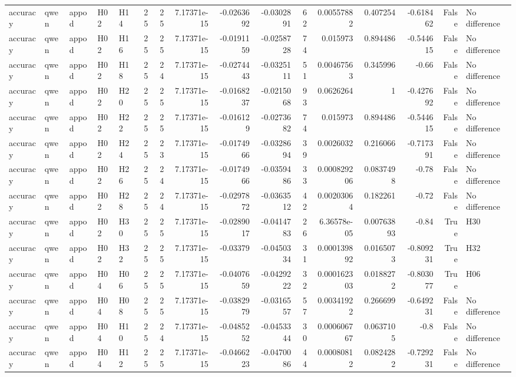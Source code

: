 \begin{longtable}{lllllrrrrrrrrrrl}
accuracy & qwen & appod & H02 & H14 & 25 & 25 & 7.17371e-15 & -0.0263692 & -0.0302891 & 62 & 0.00557882 & 0.407254 & -0.618462 & False & No difference \\
accuracy & qwen & appod & H02 & H16 & 25 & 25 & 7.17371e-15 & -0.0191159 & -0.0258728 & 74 & 0.015973 & 0.894486 & -0.544615 & False & No difference \\
accuracy & qwen & appod & H02 & H18 & 25 & 24 & 7.17371e-15 & -0.0274443 & -0.0325111 & 51 & 0.00467563 & 0.345996 & -0.66 & False & No difference \\
accuracy & qwen & appod & H02 & H20 & 25 & 25 & 7.17371e-15 & -0.0168237 & -0.0215068 & 93 & 0.0626264 & 1 & -0.427692 & False & No difference \\
accuracy & qwen & appod & H02 & H22 & 25 & 25 & 7.17371e-15 & -0.016129 & -0.0273682 & 74 & 0.015973 & 0.894486 & -0.544615 & False & No difference \\
accuracy & qwen & appod & H02 & H24 & 25 & 23 & 7.17371e-15 & -0.0174966 & -0.0328694 & 39 & 0.0026032 & 0.216066 & -0.717391 & False & No difference \\
accuracy & qwen & appod & H02 & H26 & 25 & 24 & 7.17371e-15 & -0.0174966 & -0.0359486 & 33 & 0.000829206 & 0.0837498 & -0.78 & False & No difference \\
accuracy & qwen & appod & H02 & H28 & 25 & 24 & 7.17371e-15 & -0.0297872 & -0.0363512 & 42 & 0.00203064 & 0.182261 & -0.72 & False & No difference \\
accuracy & qwen & appod & H02 & H30 & 25 & 25 & 7.17371e-15 & -0.0289017 & -0.0414783 & 26 & 6.36578e-05 & 0.00763893 & -0.84 & True & H30 \\
accuracy & qwen & appod & H02 & H32 & 25 & 25 & 7.17371e-15 & -0.03379 & -0.0450334 & 31 & 0.000139892 & 0.0165073 & -0.809231 & True & H32 \\
accuracy & qwen & appod & H04 & H06 & 25 & 25 & 7.17371e-15 & -0.0407659 & -0.0429222 & 32 & 0.000162303 & 0.0188272 & -0.803077 & True & H06 \\
accuracy & qwen & appod & H04 & H08 & 25 & 25 & 7.17371e-15 & -0.0382979 & -0.0316557 & 57 & 0.00341922 & 0.266699 & -0.649231 & False & No difference \\
accuracy & qwen & appod & H04 & H10 & 25 & 24 & 7.17371e-15 & -0.0485252 & -0.0453344 & 30 & 0.000606767 & 0.0637105 & -0.8 & False & No difference \\
accuracy & qwen & appod & H04 & H12 & 25 & 25 & 7.17371e-15 & -0.0466223 & -0.0470086 & 44 & 0.00080812 & 0.0824282 & -0.729231 & False & No difference \\

\end{longtable}

